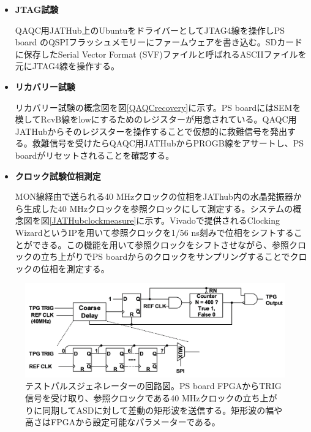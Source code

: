 \begin{itemize}
    \item \textbf{JTAG試験}\par
    QAQC用JATHub上のUbuntuをドライバーとしてJTAG4線を操作しPS board のQSPIフラッシュメモリーにファームウェアを書き込む。SDカードに保存したSerial Vector Format (SVF)ファイルと呼ばれるASCIIファイルを元にJTAG4線を操作する。
    \baselineskip

    \item \textbf{リカバリー試験}\par
    リカバリー試験の概念図を図\ref{QAQCrecovery}に示す。PS boardにはSEMを模してRcvB線をlowにするためのレジスターが用意されている。QAQC用JATHubからそのレジスターを操作することで仮想的に救難信号を発出する。救難信号を受けたらQAQC用JATHubからPROGB線をアサートし、PS boardがリセットされることを確認する。
    \baselineskip
    
    \item \textbf{クロック試験位相測定}\par
    MON線経由で送られる40 MHzクロックの位相をJAThub内の水晶発振器から生成した40 MHzクロックを参照クロックにして測定する。システムの概念図を図\ref{JATHubclockmeasure}\cite{mt_atanaka}に示す。Vivadoで提供されるClocking WizardというIPを用いて参照クロックを1/56 ns刻みで位相をシフトすることができる。この機能を用いて参照クロックをシフトさせながら、参照クロックの立ち上がりでPS boardからのクロックをサンプリングすることでクロックの位相を測定する。
    \baselineskip
　
\end{itemize}



\begin{figure} 
\centering
\includegraphics[width=16cm]{fig/PSBtpg.png}
\caption[テストパルスジェネレーターの回路図]{テストパルスジェネレーターの回路図。PS board FPGAからTRIG信号を受け取り、参照クロックである40 MHzクロックの立ち上がりに同期してASDに対して差動の矩形波を送信する。矩形波の幅や高さはFPGAから設定可能なパラメーターである。}
\label{PSBtpg}
\end{figure}


